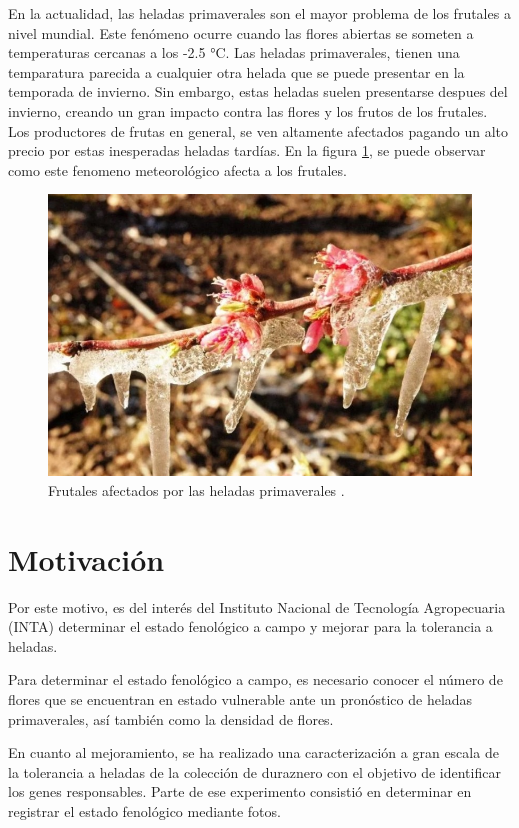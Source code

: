 En la actualidad, las heladas primaverales son el mayor problema de los frutales a nivel mundial. Este fenómeno ocurre cuando las flores abiertas se someten a temperaturas cercanas a los -2.5 °C. Las heladas primaverales, tienen una temparatura parecida a cualquier otra helada que se puede presentar en la temporada de invierno. Sin embargo, estas heladas suelen presentarse despues del invierno, creando un gran impacto contra las flores y los frutos de los frutales. Los productores de frutas en general, se ven altamente afectados pagando un alto precio por estas inesperadas heladas tardías. En la figura \ref{fig:helada}, se puede observar como este fenomeno meteorológico afecta a los frutales.

\begin{figure}[htpb]
	\centering
	\includegraphics[scale=.5]{./Figures/heladas3.jpeg}
	\caption{Frutales afectados por las heladas primaverales \cite{WEBSITE:1}.}
	\label{fig:helada}
\end{figure}

\section{Motivación}

Por este motivo, es del interés del Instituto Nacional de Tecnología Agropecuaria (INTA) determinar el estado fenológico a campo y mejorar para la tolerancia a heladas.

Para determinar el estado fenológico a campo, es necesario conocer el número de flores que se encuentran en estado vulnerable ante un pronóstico de heladas primaverales, así también como la densidad de flores.

En cuanto al mejoramiento, se ha realizado una caracterización a gran escala de la tolerancia a heladas de la colección de duraznero con el objetivo de identificar los genes responsables. Parte de ese experimento consistió en determinar en registrar el estado fenológico mediante fotos.

